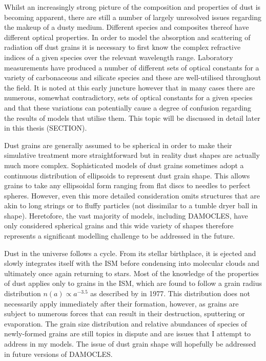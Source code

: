 Whilst an increasingly strong picture of the composition and properties of dust is becoming apparent, there are still a number of largely unresolved issues regarding the makeup of a dusty medium.
Different species and composites thereof have different optical properties.  In order to model the absorption and scattering of radiation off dust grains it is necessary to first know the complex refractive indices of a given species over the relevant wavelength range.  Laboratory measurements have produced a number of different sets of optical constants for a variety of carbonaceous and silicate species and these are well-utilised throughout the field.  It is noted at this early juncture however that in many cases there are numerous, somewhat contradictory, sets of optical constants for a given species and that these variations can potentially cause a degree of confusion regarding the results of models that utilise them.  This topic will be discussed in detail later in this thesis (SECTION).

Dust grains are generally assumed to be spherical in order to make their simulative treatment more straightforward but in reality dust shapes are actually much more complex.  Sophisticated models of dust grains sometimes adopt a continuous distribution of ellipsoids to represent dust grain shape.  This allows grains to take any ellipsoidal form ranging from flat discs to needles to perfect spheres.  However, even this more detailed consideration omits structures that are akin to long strings or to fluffy particles (not dissimilar to a tumble dryer ball in shape). Heretofore, the vast majority of models, including DAMOCLES, have only considered spherical grains and this wide variety of shapes therefore represents a significant modelling challenge to be addressed in the future.

Dust in the universe follows a cycle.  From its stellar birthplace, it is ejected and slowly integrates itself with the ISM before condensing into molecular clouds and ultimately once again returning to stars.  Most of the knowledge of the properties of dust applies only to grains in the ISM, which are found to follow a grain radius distribution $n(a) \propto a^{-3.5}$ as described by \citeauthor{Mathis1977} in 1977.  This distribution does not necessarily apply immediately after their formation, however, as grains are subject to numerous forces that can result in their destruction, sputtering or evaporation.  The grain size distribution and relative abundances of species of newly-formed grains are still topics in dispute and are issues that I attempt to address in my models.  The issue of dust grain shape will hopefully be addressed in future versions of DAMOCLES.

